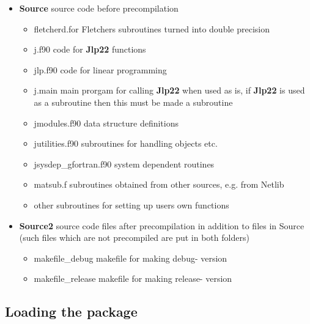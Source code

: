 \begin{itemize}
\begin{itemize}
\end{itemize}

\item \textbf{Source} \hspace{1cm} source code before precompilation
\begin{itemize}
\item fletcherd.for \hspace{1cm}Fletchers subroutines turned into double precision
\item j.f90 \hspace{1cm}code for \textbf{Jlp22} functions
\item jlp.f90 \hspace{1cm}code for linear programming
\item j.main \hspace{1cm}main prorgam for calling \textbf{Jlp22} when used as is, if \textbf{Jlp22} is used as
a subroutine then this must be made a subroutine
\item jmodules.f90 \hspace{1cm}data structure definitions
\item jutilities.f90 \hspace{1cm}subroutines for handling objects etc.
\item jsysdep\_gfortran.f90 \hspace{1cm}system dependent routines
\item matsub.f \hspace{1cm}subroutines obtained from other sources, e.g. from Netlib
\item other subroutines for setting up users own  functions

\end{itemize}
\item\textbf{Source2} \hspace{1cm} source code files after precompilation
in addition to files in Source (such files which are not precompiled are put in both folders)
\begin{itemize}
\item makefile\_debug \hspace{1cm}makefile for making debug- version
\item makefile\_release\hspace{1cm} makefile for making release- version
\end{itemize}


\end{itemize}

\subsection{Loading the package}
\label{gitload}


